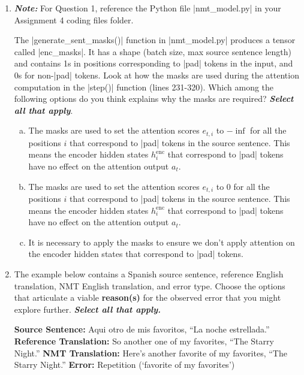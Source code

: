 \begin{enumerate}[1.]
\item {}

{\em {\bf Note:}} For Question 1, reference the Python file |nmt_model.py| in your Assignment 4 coding files folder. 

The |generate_sent_masks()| function in |nmt_model.py| produces a tensor called |enc_masks|. It has a shape (batch size, max source sentence length) and contains 1s in positions corresponding to |pad| tokens in the input, and 0s for non-|pad| tokens. Look at how the masks are used during the attention computation in the |step()| function (lines 231-320). Which among the following options do you think explains why the masks are required? {\em{\bf Select all that apply}}.

\begin{enumerate}[(a)]
\item The masks are used to set the attention scores $e_{t,i}$ to $-\inf$ for all the positions $i$ that correspond to |pad| tokens in the source sentence. This means the encoder hidden states $h_i^\text{enc}$ that correspond to |pad| tokens have no effect on the attention output $a_t$.
\item The masks are used to set the attention scores $e_{t,i}$ to 0 for all the positions $i$ that correspond to |pad| tokens in the source sentence. This means the encoder hidden states $h_i^\text{enc}$ that correspond to |pad| tokens have no effect on the attention output $a_t$.
\item It is necessary to apply the masks to ensure we don’t apply attention on the encoder hidden states that correspond to |pad| tokens. 
\end{enumerate}


\item {}

The example below contains a Spanish source sentence, reference English translation, NMT English translation, and error type. Choose the options that articulate a viable {\bf reason(s)} for the observed error that you might explore further. {\bf {\em Select all that apply.}}

{\bf Source Sentence:} Aqui otro de mis favoritos, ``La noche estrellada.''
{\bf Reference Translation:} So another one of my favorites, ``The Starry Night.''
{\bf NMT Translation:} Here's another favorite of my favorites, ``The Starry Night.''
{\bf Error:} Repetition (`favorite of my favorites')


\end{enumerate}
